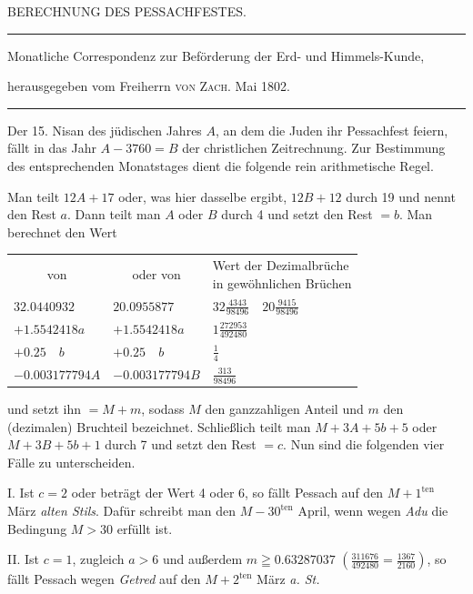 \clearpage{}%
\begin{center}
{\large BERECHNUNG DES PESSACHFESTES.\par}
\medskip\hrule\medskip
{\small Monatliche Correspondenz zur Beförderung der Erd- und Himmels-Kunde,\par
herausgegeben vom Freiherrn \textsc{von Zach}. Mai 1802.\par}
\medskip\hrule
\end{center}\medskip
Der 15. Nisan des jüdischen Jahres $A$, an dem die Juden ihr Pessachfest feiern, fällt in das Jahr $A-3760=B$ der christlichen Zeitrechnung. Zur Bestimmung des entsprechenden Monatstages dient die folgende rein arithmetische Regel.

Man teilt $12A+17$ oder, was hier dasselbe ergibt, $12B+12$ durch 19 und nennt den Rest $a$. Dann teilt man $A$ oder $B$ durch 4 und setzt den Rest $=b$. Man berechnet den Wert
\begin{center}\small
\begin{tabular}{lll}
\multicolumn{1}{c}{von} & \multicolumn{1}{c}{oder von} & \shortstack{Wert der Dezimalbrüche\\in gewöhnlichen Brüchen}\\[5pt]
$32.0440932$ & $20.0955877$ & $32\frac{4343}{98496}\quad20\frac{9415}{98496}$\\[5pt]
$+1.5542418a$ & $+1.5542418a$ & $1\frac{272953}{492480}$\\[5pt]
$+0.25\quad b$ & $+0.25\quad b$ & $\frac14$\\[5pt]
$-0.003177794A$ & $-0.003177794B$ & $\frac{313}{98496}$
\end{tabular}
\end{center}
und setzt ihn $=M+m$, sodass $M$ den ganzzahligen Anteil und $m$ den (dezimalen) Bruchteil bezeichnet. Schließlich teilt man $M+3A+5b+5$ oder $M+3B+5b+1$ durch 7 und setzt den Rest $=c$. Nun sind die folgenden vier Fälle zu unterscheiden.

I. Ist $c=2$ oder beträgt der Wert 4 oder 6, so fällt Pessach auf den $M+1^{\mathrm{ten}}$ März \textit{alten Stils}. Dafür schreibt man den $M-30^{\mathrm{ten}}$ April, wenn wegen \textit{Adu} die Bedingung $M>30$ erfüllt ist.
%

II. Ist $c=1$, zugleich $a>6$ und außerdem $m\geqq0.63287037$
$(\frac{311676}{492480}=\frac{1367}{2160})$, so fällt Pessach wegen \textit{Getred} auf den $M+2^{\mathrm{ten}}$ März \textit{a. St.}


